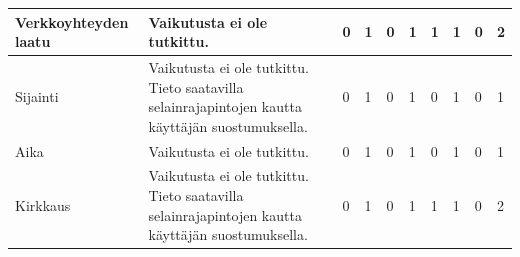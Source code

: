 \documentclass[finnish, 12pt, a4paper, elec, utf8, a-1b, online]{aaltothesis}
\begin{document}
{\begin{longtable}{p{2.5cm}|p{6cm}|p{0.5cm}p{0.5cm}p{0.5cm}|p{0.5cm}|p{0.5cm}p{0.5cm}p{0.5cm}|p{0.5cm}|}
    \midrule
    Verkkoyhteyden laatu                    & Vaikutusta ei ole tutkittu.                                                                                                                                                                                                                                                                                                                                             & 0                                          & 1                                   & 0                                      & 1                            & 1                                               & 1                                         & 0                                         & 2                            \\
    \midrule
    Sijainti                                & Vaikutusta ei ole tutkittu. Tieto saatavilla selainrajapintojen kautta käyttäjän suostumuksella.                                                                                                                                                                                                                                                                        & 0                                          & 1                                   & 0                                      & 1                            & 0                                               & 1                                         & 0                                         & 1                            \\
    \midrule
    Aika                                    & Vaikutusta ei ole tutkittu.                                                                                                                                                                                                                                                                                                                                             & 0                                          & 1                                   & 0                                      & 1                            & 0                                               & 1                                         & 0                                         & 1                            \\
    \midrule
    Kirkkaus                                & Vaikutusta ei ole tutkittu. Tieto saatavilla selainrajapintojen kautta käyttäjän suostumuksella.                                                                                                                                                                                                                                                                        & 0                                          & 1                                   & 0                                      & 1                            & 1                                               & 1                                         & 0                                         & 2                            \\

\end{longtable}}
\end{document}
